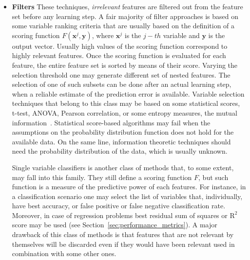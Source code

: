 	\begin{itemize}
		
		\item[] \textbf{Filters}
		These techniques, \textit{irrelevant} features are filtered out from the feature set before any learning step.
		A fair majority of filter approaches is based on some variable ranking criteria that are usually based on the definition of a scoring function $F(\bm{x}^{j}, \bm{y})$, where $\bm{x}^{j}$ is the $j-th$ variable and $\bm{y}$ is the output vector. Usually high values of the scoring function correspond to highly relevant features. Once the scoring function is evaluated for each feature, the entire feature set is sorted by means of their score. Varying the selection threshold one may generate different set of nested features. The selection of one of such subsets can be done after an actual learning step, \ie when a reliable estimate of the prediction error is available.
		Variable selection techniques that belong to this class may be based on some statistical scores, \eg t-test, ANOVA, Pearson correlation, or some entropy measures, \eg the mutual information~\cite{everitt2006cambridge}. Statistical score-based algorithms may fail when the assumptions on the probability distribution function does not hold for the available data. On the same line, information theoretic techniques should need the probability distribution of the data, which is usually unknown.
		
		Single variable classifiers is another class of methods that, to some extent, may fall into this family. They still define a scoring function $F$, but such function is a measure of the predictive power of each features. For instance, in a classification scenario one may select the list of variables that, individually, have best accuracy, or false positive or false negative classification rate. Moreover, in case of regression problems best residual sum of squares or $\text{R}^2$ score may be used  (see Section~\ref{sec:performance_metrics}). A major drawback of this class of methods is that features that are not relevant by themselves will be discarded even if they would have been relevant used in combination with some other ones.
		

\end{itemize}
